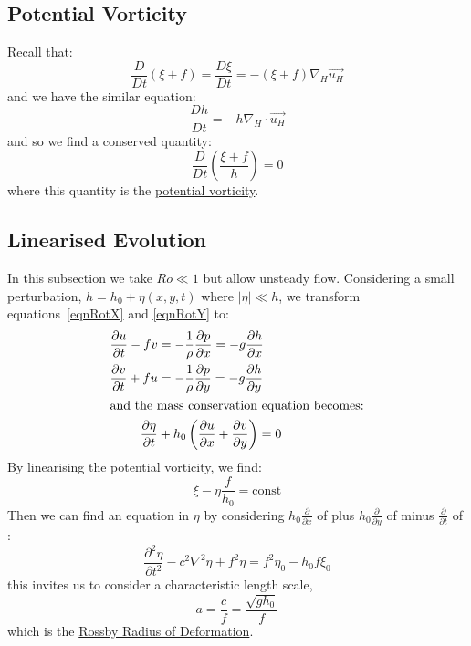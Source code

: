 \documentclass[../Main.tex]{subfiles}
\begin{document}
\subsection{Potential Vorticity}
Recall that:
\begin{equation*}
    \frac{D}{D t} \left(\xi + f\right) = \frac{D \xi}{D t} = -(\xi + f) \nabla_H \vec{u_H}
\end{equation*}
and we have the similar equation:
\begin{equation*}
    \frac{D h}{D t} = -h \nabla_H \cdot \vec{u_H}
\end{equation*}
and so we find a conserved quantity:
\begin{equation*}
    \frac{D}{D t}\left(\frac{\xi + f}{h}\right) = 0
\end{equation*}
where this quantity is the \underline{potential vorticity}.
\subsection{Linearised Evolution}
In this subsection we take $Ro \ll 1$ but allow unsteady flow. Considering a small perturbation, $h = h_0 + \eta(x, y, t)$ where $|\eta| \ll h$, we transform equations~\ref{eqnRotX} and \ref{eqnRotY} to:
\begin{align}
    \frac{\partial u}{\partial t} - fv &= -\frac1\rho \frac{\partial p}{\partial x} = -g \frac{\partial h}{\partial x} \label{eqnLinRotX} \\
    \frac{\partial v}{\partial t} + fu &= -\frac1\rho \frac{\partial p}{\partial y} = -g \frac{\partial h}{\partial y} \label{eqnLinRotY} \\
    \intertext{and the mass conservation equation becomes:}
    \frac{\partial \eta}{\partial t} &+ h_0 \left(\frac{\partial u}{\partial x} + \frac{\partial v}{\partial y}\right) = 0 \label{eqnLinRotMassConserve}
\end{align}
By linearising the potential vorticity, we find:
\begin{equation*}
    \xi - \eta \frac{f}{h_0} = \text{const}
\end{equation*}
Then we can find an equation in $\eta$ by considering $h_0 \frac{\partial}{\partial x}$ of  plus $h_0 \frac{\partial}{\partial y}$ of  minus $\frac{\partial}{\partial t}$ of :
\begin{equation}
    \frac{\partial^{2}\eta}{\partial t^{2}} - c^2 \nabla^2 \eta + f^2 \eta = f^2 \eta_0 - h_0 f \xi_0
    \label{eqnLinRot}
\end{equation}
this invites us to consider a characteristic length scale,
\begin{equation*}
    a = \frac{c}{f} = \frac{\sqrt{g h_0}}{f}
\end{equation*}
which is the \underline{Rossby Radius of Deformation}.
\end{document}
